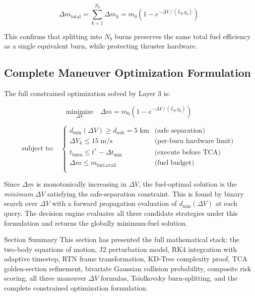 \documentclass[11pt, a4paper]{article}
\begin{document}
\[
  \Delta m_{\text{total}} = \sum_{k=1}^{N_b} \Delta m_k = m_0 \left(1 - e^{-\Delta V \,/\, (I_{sp}\, g_0)}\right)
\]

This confirms that splitting into $N_b$ burns preserves the same total fuel efficiency as a single
equivalent burn, while protecting thruster hardware.

\subsection{Complete Maneuver Optimization Formulation}

The full constrained optimization solved by Layer 3 is:

\[
  \underset{\Delta V}{\text{minimize}}
  \quad
  \Delta m = m_0\!\left(1 - e^{-\Delta V\,/\,(I_{sp}\,g_0)}\right)
\]

\[
  \text{subject to:}
  \quad
  \begin{cases}
    d_{\min}(\Delta V) \geq d_{\text{safe}} = 5\;\text{km} & \text{(safe separation)} \\
    \Delta V_k \leq 15\;\text{m/s} & \text{(per-burn hardware limit)} \\
    t_{\text{burn}} \leq t^* - \Delta t_{\min} & \text{(execute before TCA)} \\
    \Delta m \leq m_{\text{fuel,avail}} & \text{(fuel budget)} \\
  \end{cases}
\]

Since $\Delta m$ is monotonically increasing in $\Delta V$, the fuel-optimal solution is the
\textit{minimum} $\Delta V$ satisfying the safe-separation constraint. This is found by binary
search over $\Delta V$ with a forward propagation evaluation of $d_{\min}(\Delta V)$ at each
query. The decision engine evaluates all three candidate strategies under this formulation and
returns the globally minimum-fuel solution.

\begin{layerbox}[colframe=safegreen]{Section Summary}
This section has presented the full mathematical stack: the two-body equations of motion,
J2 perturbation model, RK4 integration with adaptive timestep, RTN frame transformation,
KD-Tree complexity proof, TCA golden-section refinement, bivariate Gaussian collision
probability, composite risk scoring, all three maneuver $\Delta V$ formulas, Tsiolkovsky
burn-splitting, and the complete constrained optimization formulation.
\end{layerbox}
\end{document}
